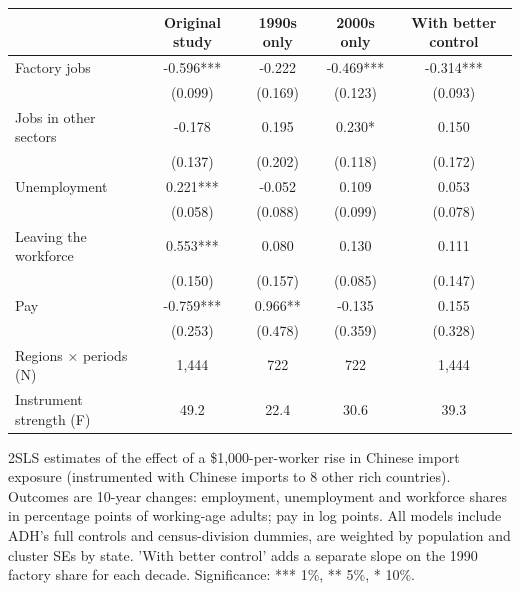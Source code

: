\begin{tabular}{lcccc}
\toprule
 & Original study & 1990s only & 2000s only & With better control \\
\midrule
Factory jobs & -0.596*** & -0.222 & -0.469*** & -0.314*** \\
 & (0.099) & (0.169) & (0.123) & (0.093) \\
Jobs in other sectors & -0.178 & 0.195 & 0.230* & 0.150 \\
 & (0.137) & (0.202) & (0.118) & (0.172) \\
Unemployment & 0.221*** & -0.052 & 0.109 & 0.053 \\
 & (0.058) & (0.088) & (0.099) & (0.078) \\
Leaving the workforce & 0.553*** & 0.080 & 0.130 & 0.111 \\
 & (0.150) & (0.157) & (0.085) & (0.147) \\
Pay & -0.759*** & 0.966** & -0.135 & 0.155 \\
 & (0.253) & (0.478) & (0.359) & (0.328) \\
Regions $\times$ periods (N) & 1,444 & 722 & 722 & 1,444 \\
Instrument strength (F) & 49.2 & 22.4 & 30.6 & 39.3 \\
\bottomrule
\end{tabular}

{\tiny 2SLS estimates of the effect of a \$1,000-per-worker rise in Chinese import exposure (instrumented with Chinese imports to 8 other rich countries). Outcomes are 10-year changes: employment, unemployment and workforce shares in percentage points of working-age adults; pay in log points. All models include ADH's full controls and census-division dummies, are weighted by population and cluster SEs by state. 'With better control' adds a separate slope on the 1990 factory share for each decade. Significance: *** 1\%, ** 5\%, * 10\%.}
